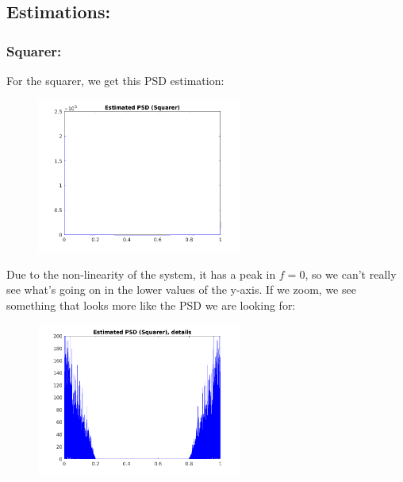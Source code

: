 \documentclass[a4paper,11pt]{article}
\begin{document}
\newpage

\subsection{Estimations:}

\subsubsection{Squarer:}

For the squarer, we get this PSD estimation:

\begin{figure}[!hp]
    \begin{center}
      \includegraphics[width=0.6\textwidth]{images/study3/R_es_sq.png}
    \end{center}
\end{figure}

Due to the non-linearity of the system, it has a peak in $f = 0$, so we can't
really see what's going on in the lower values of the y-axis. If we zoom, we
see something that looks more like the PSD we are looking for:

\begin{figure}[!hp]
    \begin{center}
      \includegraphics[width=0.6\textwidth]{images/study3/R_es_sq_zoom.png}
    \end{center}
\end{figure}
\end{document}
